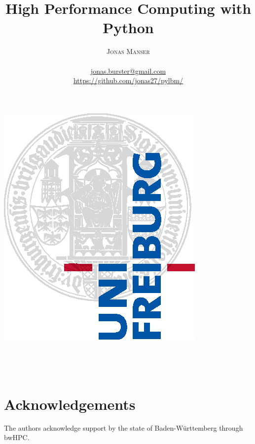 \documentclass[a4paper,12pt, oneside]{book}
\title{\Huge {\textbf High Performance Computing with Python}}
\author{\textsc{Jonas Manser} \\ 
\vspace{3mm}\text{4953222}  \\
\vspace{3mm}\url{jonas.burster@gmail.com} \\
\vspace{3mm}\url{https://github.com/jonas27/pylbm/}}
\begin{document}
\makeatletter
\begin{titlepage}
  \begin{center}
    \includegraphics[width=0.5\linewidth]{logos/Uni_Logo-Grundversion_E1_A4_CMYK.eps}\\[4ex]
    
    \vspace*{10mm}
    
    {\huge \bfseries  \@title }\\[2ex]
    
    \vspace*{10mm}
    
    {\LARGE  \@author}\\
    
    \vspace*{10mm}
    
    {\large \@date}
  \end{center}
\end{titlepage}
\makeatother
\thispagestyle{empty}

\tableofcontents
\thispagestyle{plain}
\listoffigures
\thispagestyle{plain}
\lstlistoflistings
\thispagestyle{plain}
\clearpage




\pagestyle{fancy}
\renewcommand{\chaptermark}[1]{%
  \markboth{\thechapter.\ #1}{}}
\renewcommand{\sectionmark}[1]{%
  \markright{\thesection.\ #1}}






\section{Acknowledgements}
The authors acknowledge support by the state of Baden-Württemberg through bwHPC.



\end{document}
